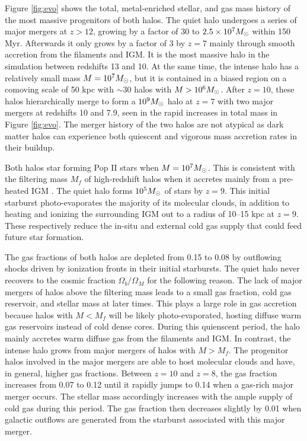 \documentclass[apjl]{emulateapj}
\begin{document}

Figure \ref{fig:evo} shows the total, metal-enriched stellar, and gas
mass history of the most massive progenitors of both halos.  The quiet
halo undergoes a series of major mergers at $z > 12$, growing by a
factor of 30 to $2.5 \times 10^7 \Ms$ within 150 Myr.  Afterwards it
only grows by a factor of 3 by $z=7$ mainly through smooth accretion
from the filaments and IGM.  It is the most massive halo in the
simulation between redshifts 13 and 10.  At the same time, the intense
halo has a relatively small mass $M = 10^7 \Ms$, but it is contained
in a biased region on a comoving scale of 50 kpc with $\sim30$ halos
with $M > 10^6 \Ms$.  After $z=10$, these halos hierarchically merge
to form a $10^9 \Ms$ halo at $z=7$ with two major mergers at redshifts
10 and 7.9, seen in the rapid increases in total mass in Figure
\ref{fig:evo}.  The merger history of the two halos are not atypical
as dark matter halos can experience both quiescent and vigorous mass
accretion rates in their buildup.

Both halos star forming Pop II stars when $M = 10^7 \Ms$.  This is
consistent with the filtering mass $M_f$ of high-redshift halos when
it accretes mainly from a pre-heated IGM \citep{gnedin98, gnedin00,
  Wise08_Gal}.  The quiet halo forms $10^5 \Ms$ of stars by $z=9$.
This initial starburst photo-evaporates the majority of its molecular
clouds, in addition to heating and ionizing the surrounding IGM out to
a radius of 10--15 kpc at $z=9$.  These respectively reduce the
in-situ and external cold gas supply that could feed future star
formation.

The gas fractions of both halos are depleted from 0.15 to 0.08 by
outflowing shocks driven by ionization fronts in their initial
starbursts.  The quiet halo never recovers to the cosmic fraction
$\Omega_b/\Omega_M$ for the following reason.  The lack of major
mergers of halos above the filtering mass leads to a small gas
fraction, cold gas reservoir, and stellar mass at later times.  This
plays a large role in gas accretion because halos with $M < M_f$ will
be likely photo-evaporated, hosting diffuse warm gas reservoirs
instead of cold dense cores.  During this quienscent period, the halo
mainly accretes warm diffuse gas from the filaments and IGM.  In
contrast, the intense halo grows from major mergers of halos with $M >
M_f$.  The progenitor halos involved in the major mergers are able to
host molecular clouds and have, in general, higher gas fractions.
Between $z=10$ and $z=8$, the gas fraction increases from 0.07 to 0.12
until it rapidly jumps to 0.14 when a gas-rich major merger occurs.
The stellar mass accordingly increases with the ample supply of cold
gas during this period.  The gas fraction then decreases slightly by
0.01 when galactic outflows are generated from the starburst
associated with this major merger.
\end{document}
